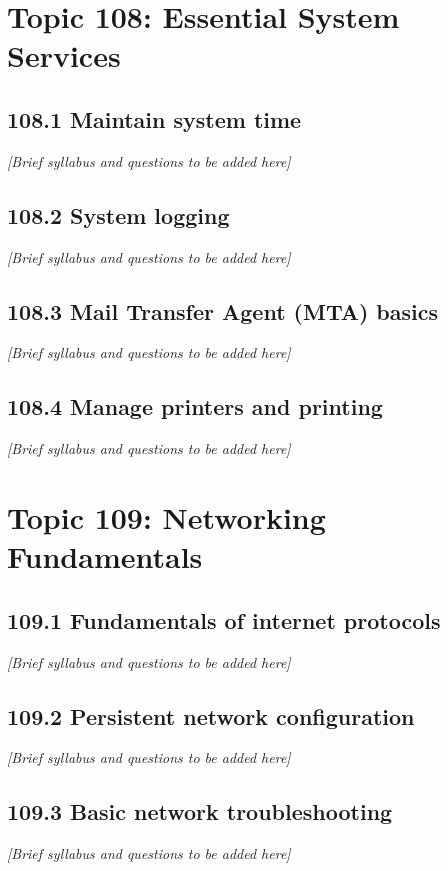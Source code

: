\documentclass[a4paper]{report}
\begin{document}
\chapter{Topic 108: Essential System Services}
\section{108.1 Maintain system time}
\textit{[Brief syllabus and questions to be added here]}

\section{108.2 System logging}
\textit{[Brief syllabus and questions to be added here]}

\section{108.3 Mail Transfer Agent (MTA) basics}
\textit{[Brief syllabus and questions to be added here]}

\section{108.4 Manage printers and printing}
\textit{[Brief syllabus and questions to be added here]}

\chapter{Topic 109: Networking Fundamentals}
\section{109.1 Fundamentals of internet protocols}
\textit{[Brief syllabus and questions to be added here]}

\section{109.2 Persistent network configuration}
\textit{[Brief syllabus and questions to be added here]}

\section{109.3 Basic network troubleshooting}
\textit{[Brief syllabus and questions to be added here]}
\end{document}

